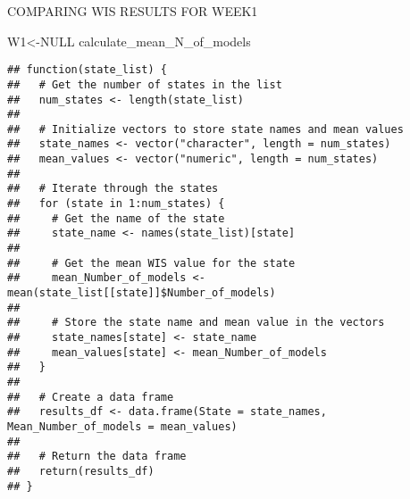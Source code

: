 \documentclass[
]{article}
\newenvironment{Shaded}{\begin{snugshade}}{\end{snugshade}}
\newcommand{\AttributeTok}[1]{\textcolor[rgb]{0.13,0.29,0.53}{#1}}
\newcommand{\CommentTok}[1]{\textcolor[rgb]{0.56,0.35,0.01}{\textit{#1}}}
\newcommand{\ConstantTok}[1]{\textcolor[rgb]{0.56,0.35,0.01}{#1}}
\newcommand{\FunctionTok}[1]{\textcolor[rgb]{0.13,0.29,0.53}{\textbf{#1}}}
\newcommand{\NormalTok}[1]{#1}
\newcommand{\OtherTok}[1]{\textcolor[rgb]{0.56,0.35,0.01}{#1}}
\newcommand{\SpecialCharTok}[1]{\textcolor[rgb]{0.81,0.36,0.00}{\textbf{#1}}}
\begin{document}
\begin{Shaded}
\end{Shaded}

COMPARING WIS RESULTS FOR WEEK1

\begin{Shaded}
\begin{Highlighting}[]
\NormalTok{W1}\OtherTok{\textless{}{-}}\ConstantTok{NULL}
\NormalTok{calculate\_mean\_N\_of\_models}
\end{Highlighting}
\end{Shaded}

\begin{verbatim}
## function(state_list) {
##   # Get the number of states in the list
##   num_states <- length(state_list)
##   
##   # Initialize vectors to store state names and mean values
##   state_names <- vector("character", length = num_states)
##   mean_values <- vector("numeric", length = num_states)
##   
##   # Iterate through the states
##   for (state in 1:num_states) {
##     # Get the name of the state
##     state_name <- names(state_list)[state]
##     
##     # Get the mean WIS value for the state
##     mean_Number_of_models <- mean(state_list[[state]]$Number_of_models)
##     
##     # Store the state name and mean value in the vectors
##     state_names[state] <- state_name
##     mean_values[state] <- mean_Number_of_models
##   }
##   
##   # Create a data frame
##   results_df <- data.frame(State = state_names, Mean_Number_of_models = mean_values)
##   
##   # Return the data frame
##   return(results_df)
## }
\end{verbatim}
\end{document}
